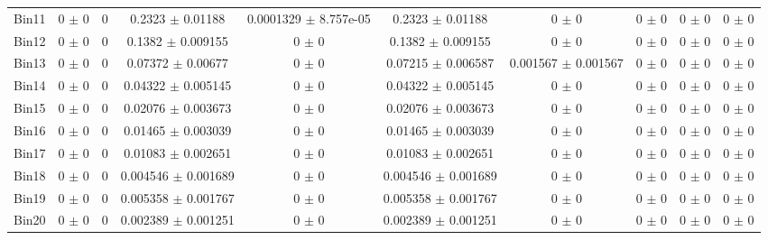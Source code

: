 \begin{tabular}{@{\extracolsep{4pt}}lccccccccc@{}}
     Bin11 & 0 $\pm$ 0 & 0 & 0.2323 $\pm$ 0.01188 & 0.0001329 $\pm$ 8.757e-05 & 0.2323 $\pm$ 0.01188 & 0 $\pm$ 0 & 0 $\pm$ 0 & 0 $\pm$ 0 & 0 $\pm$ 0 \\ 
     Bin12 & 0 $\pm$ 0 & 0 & 0.1382 $\pm$ 0.009155 & 0 $\pm$ 0 & 0.1382 $\pm$ 0.009155 & 0 $\pm$ 0 & 0 $\pm$ 0 & 0 $\pm$ 0 & 0 $\pm$ 0 \\ 
     Bin13 & 0 $\pm$ 0 & 0 & 0.07372 $\pm$ 0.00677 & 0 $\pm$ 0 & 0.07215 $\pm$ 0.006587 & 0.001567 $\pm$ 0.001567 & 0 $\pm$ 0 & 0 $\pm$ 0 & 0 $\pm$ 0 \\ 
     Bin14 & 0 $\pm$ 0 & 0 & 0.04322 $\pm$ 0.005145 & 0 $\pm$ 0 & 0.04322 $\pm$ 0.005145 & 0 $\pm$ 0 & 0 $\pm$ 0 & 0 $\pm$ 0 & 0 $\pm$ 0 \\ 
     Bin15 & 0 $\pm$ 0 & 0 & 0.02076 $\pm$ 0.003673 & 0 $\pm$ 0 & 0.02076 $\pm$ 0.003673 & 0 $\pm$ 0 & 0 $\pm$ 0 & 0 $\pm$ 0 & 0 $\pm$ 0 \\ 
     Bin16 & 0 $\pm$ 0 & 0 & 0.01465 $\pm$ 0.003039 & 0 $\pm$ 0 & 0.01465 $\pm$ 0.003039 & 0 $\pm$ 0 & 0 $\pm$ 0 & 0 $\pm$ 0 & 0 $\pm$ 0 \\ 
     Bin17 & 0 $\pm$ 0 & 0 & 0.01083 $\pm$ 0.002651 & 0 $\pm$ 0 & 0.01083 $\pm$ 0.002651 & 0 $\pm$ 0 & 0 $\pm$ 0 & 0 $\pm$ 0 & 0 $\pm$ 0 \\ 
     Bin18 & 0 $\pm$ 0 & 0 & 0.004546 $\pm$ 0.001689 & 0 $\pm$ 0 & 0.004546 $\pm$ 0.001689 & 0 $\pm$ 0 & 0 $\pm$ 0 & 0 $\pm$ 0 & 0 $\pm$ 0 \\ 
     Bin19 & 0 $\pm$ 0 & 0 & 0.005358 $\pm$ 0.001767 & 0 $\pm$ 0 & 0.005358 $\pm$ 0.001767 & 0 $\pm$ 0 & 0 $\pm$ 0 & 0 $\pm$ 0 & 0 $\pm$ 0 \\ 
     Bin20 & 0 $\pm$ 0 & 0 & 0.002389 $\pm$ 0.001251 & 0 $\pm$ 0 & 0.002389 $\pm$ 0.001251 & 0 $\pm$ 0 & 0 $\pm$ 0 & 0 $\pm$ 0 & 0 $\pm$ 0 \\ 
\hline\hline
  \end{tabular}

